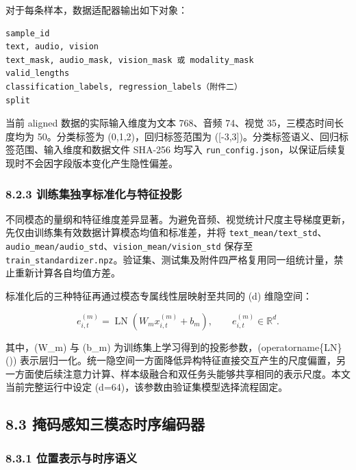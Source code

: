 \documentclass[
  12pt,
  a4paper,
]{ctexart}
\begin{document}
对于每条样本，数据适配器输出如下对象：

\begin{verbatim}
sample_id
text, audio, vision
text_mask, audio_mask, vision_mask 或 modality_mask
valid_lengths
classification_labels, regression_labels（附件二）
split
\end{verbatim}

当前 aligned 数据的实际输入维度为文本 768、音频 74、视觉
35，三模态时间长度均为 50。分类标签为 (0,1,2)，回归标签范围为
({[}-3,3{]})。分类标签语义、回归标签范围、输入维度和数据文件 SHA-256
均写入
\texttt{run\_config.json}，以保证后续复现时不会因字段版本变化产生隐性偏差。

\hypertarget{ux8badux7ec3ux96c6ux72ecux4eabux6807ux51c6ux5316ux4e0eux7279ux5f81ux6295ux5f71}{%
\subsubsection{8.2.3
训练集独享标准化与特征投影}\label{ux8badux7ec3ux96c6ux72ecux4eabux6807ux51c6ux5316ux4e0eux7279ux5f81ux6295ux5f71}}

不同模态的量纲和特征维度差异显著。为避免音频、视觉统计尺度主导梯度更新，先仅由训练集有效数据计算模态均值和标准差，并将
\texttt{text\_mean/text\_std}、\texttt{audio\_mean/audio\_std}、\texttt{vision\_mean/vision\_std}
保存至
\texttt{train\_standardizer.npz}。验证集、测试集及附件四严格复用同一组统计量，禁止重新计算各自均值方差。

标准化后的三种特征再通过模态专属线性层映射至共同的 (d) 维隐空间：

\[
e_{i,t}^{(m)}=\operatorname{LN}\left(W_m x_{i,t}^{(m)}+b_m\right),
\qquad e_{i,t}^{(m)}\in\mathbb{R}^{d}.
\]

其中，(W\_m) 与 (b\_m)
为训练集上学习得到的投影参数，(operatorname\{LN\}(\cdot))
表示层归一化。统一隐空间一方面降低异构特征直接交互产生的尺度偏置，另一方面使后续注意力计算、样本级融合和双任务头能够共享相同的表示尺度。本文当前完整运行中设定
(d=64)，该参数由验证集模型选择流程固定。

\hypertarget{ux63a9ux7801ux611fux77e5ux4e09ux6a21ux6001ux65f6ux5e8fux7f16ux7801ux5668}{%
\subsection{8.3
掩码感知三模态时序编码器}\label{ux63a9ux7801ux611fux77e5ux4e09ux6a21ux6001ux65f6ux5e8fux7f16ux7801ux5668}}

\hypertarget{ux4f4dux7f6eux8868ux793aux4e0eux65f6ux5e8fux8bedux4e49}{%
\subsubsection{8.3.1
位置表示与时序语义}\label{ux4f4dux7f6eux8868ux793aux4e0eux65f6ux5e8fux8bedux4e49}}
\end{document}
